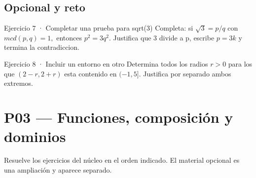 \documentclass[10pt,a4paper,oneside,openany]{book}
\begin{document}
\section*{Opcional y reto}
\begin{PSevenOptionalFixed}{Ejercicio 7 · Completar una prueba para sqrt(3)}
Completa: si \(\sqrt{3}=p/q\) con \(mcd(p,q)=1,\) entonces \(p^{2}=3q^{2}\). Justifica que \(3\) divide a p, escribe \(p=3k\) y termina la contradiccion.
\end{PSevenOptionalFixed}
\begin{PSevenOptionalFixed}{Ejercicio 8 · Incluir un entorno en otro}
Determina todos los radios \(r>0\) para los que \((2-r,2+r)\) esta contenido en \((-1,5]\). Justifica por separado ambos extremos.
\end{PSevenOptionalFixed}
\chapter{P03 — Funciones, composición y dominios}
Resuelve los ejercicios del núcleo en el orden indicado. El material opcional es una ampliación y aparece separado.
\end{document}
